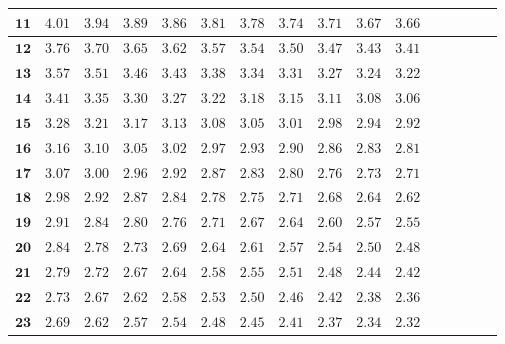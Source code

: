 \begin{customTableWrapper}{1.4}
\begin{longtable}{|r|r|r|r|r|r|r|r|r|r|r|r|r|r|r|r|}
    ${\mathbf{11}}$  & ${4.01}$   & ${3.94}$   & ${3.89}$   & ${3.86}$   & ${3.81}$   & ${3.78}$   & ${3.74}$   & ${3.71}$   & ${3.67}$   & ${3.66}$   \\  \hline 
    ${\mathbf{12}}$  & ${3.76}$   & ${3.70}$   & ${3.65}$   & ${3.62}$   & ${3.57}$   & ${3.54}$   & ${3.50}$   & ${3.47}$   & ${3.43}$   & ${3.41}$   \\  \hline 
    ${\mathbf{13}}$  & ${3.57}$   & ${3.51}$   & ${3.46}$   & ${3.43}$   & ${3.38}$   & ${3.34}$   & ${3.31}$   & ${3.27}$   & ${3.24}$   & ${3.22}$   \\  \hline 
    ${\mathbf{14}}$  & ${3.41}$   & ${3.35}$   & ${3.30}$   & ${3.27}$   & ${3.22}$   & ${3.18}$   & ${3.15}$   & ${3.11}$   & ${3.08}$   & ${3.06}$   \\  \hline 
    ${\mathbf{15}}$  & ${3.28}$   & ${3.21}$   & ${3.17}$   & ${3.13}$   & ${3.08}$   & ${3.05}$   & ${3.01}$   & ${2.98}$   & ${2.94}$   & ${2.92}$   \\  \hline 
    ${\mathbf{16}}$  & ${3.16}$   & ${3.10}$   & ${3.05}$   & ${3.02}$   & ${2.97}$   & ${2.93}$   & ${2.90}$   & ${2.86}$   & ${2.83}$   & ${2.81}$   \\  \hline 
    ${\mathbf{17}}$  & ${3.07}$   & ${3.00}$   & ${2.96}$   & ${2.92}$   & ${2.87}$   & ${2.83}$   & ${2.80}$   & ${2.76}$   & ${2.73}$   & ${2.71}$   \\  \hline 
    ${\mathbf{18}}$  & ${2.98}$   & ${2.92}$   & ${2.87}$   & ${2.84}$   & ${2.78}$   & ${2.75}$   & ${2.71}$   & ${2.68}$   & ${2.64}$   & ${2.62}$   \\  \hline 
    ${\mathbf{19}}$  & ${2.91}$   & ${2.84}$   & ${2.80}$   & ${2.76}$   & ${2.71}$   & ${2.67}$   & ${2.64}$   & ${2.60}$   & ${2.57}$   & ${2.55}$   \\  \hline 
    ${\mathbf{20}}$  & ${2.84}$   & ${2.78}$   & ${2.73}$   & ${2.69}$   & ${2.64}$   & ${2.61}$   & ${2.57}$   & ${2.54}$   & ${2.50}$   & ${2.48}$   \\  \hline 
    ${\mathbf{21}}$  & ${2.79}$   & ${2.72}$   & ${2.67}$   & ${2.64}$   & ${2.58}$   & ${2.55}$   & ${2.51}$   & ${2.48}$   & ${2.44}$   & ${2.42}$   \\  \hline 
    ${\mathbf{22}}$  & ${2.73}$   & ${2.67}$   & ${2.62}$   & ${2.58}$   & ${2.53}$   & ${2.50}$   & ${2.46}$   & ${2.42}$   & ${2.38}$   & ${2.36}$   \\  \hline 
    ${\mathbf{23}}$  & ${2.69}$   & ${2.62}$   & ${2.57}$   & ${2.54}$   & ${2.48}$   & ${2.45}$   & ${2.41}$   & ${2.37}$   & ${2.34}$   & ${2.32}$   \\  \hline 

\end{longtable}
\end{customTableWrapper}

